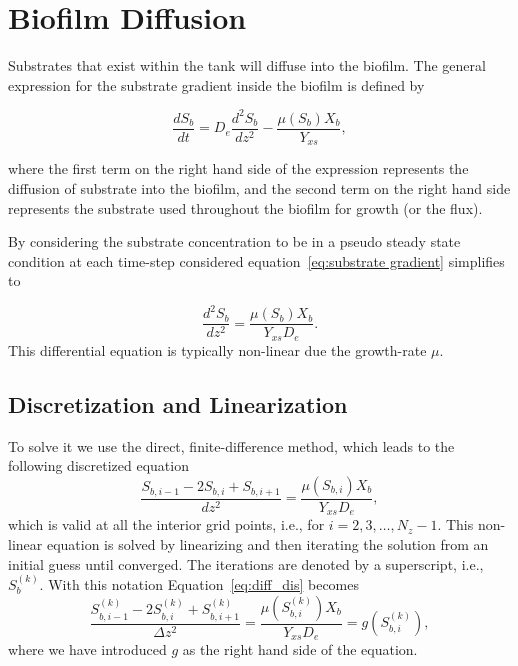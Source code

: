 \documentclass[letterpaper, twoside]{article}
\numberwithin{equation}{section}
\newcommand{\ie}{i.e.}
\begin{document}
\section{Biofilm Diffusion}
Substrates that exist within the tank will diffuse into the biofilm. The general expression for the substrate gradient inside the biofilm is defined by

\begin{equation} \label{eq:substrate gradient}
\frac{dS_b}{dt} = {D_e}\frac{d^2S_b}{dz^2} - \frac{\mu(S_b) X_b}{Y_{xs}},
\end{equation}

where the first term on the right hand side of the expression represents the diffusion of substrate into the biofilm, and the second term on the right hand side represents the substrate used throughout the biofilm for growth (or the flux).

By considering the substrate concentration to be in a pseudo steady state condition at each time-step considered equation~\ref {eq:substrate gradient} simplifies to 

\begin{equation} \label{eq:diffusion}
  \frac{d^2 S_b}{dz^2} = \frac{\mu(S_b) X_b}{Y_{xs} D_e}.
\end{equation}
This differential equation is typically non-linear due the growth-rate $\mu$.

\subsection{Discretization and Linearization}
To solve it we use the direct, finite-difference method, which leads to the following discretized equation
\begin{equation} \label{eq:diff_dis}
  \frac{ S_{b,i-1} - 2 S_{b,i} + S_{b,i+1}}{dz^2} = \frac{\mu(S_{b,i}) X_b}{Y_{xs} D_e},
\end{equation}
which is valid at all the interior grid points, \ie, for $i=2,3,\dots,N_z-1$. 
This non-linear equation is solved by linearizing and then iterating the solution from an initial guess until converged.
The iterations are denoted by a superscript, \ie, $S_{b}^{(k)}$.  With this notation Equation~\ref{eq:diff_dis} becomes
\begin{equation} \label{eq:diff_dis_iter}
  \frac{ S_{b,i-1}^{(k)} - 2 S_{b,i}^{(k)} + S_{b,i+1}^{(k)}}{\Delta z^2} = \frac{\mu\left(S_{b,i}^{(k)}\right) X_b}{Y_{xs} D_e} =  g\left(S_{b,i}^{(k)}\right),
\end{equation}
where we have introduced $g$ as the right hand side of the equation.
\end{document}
